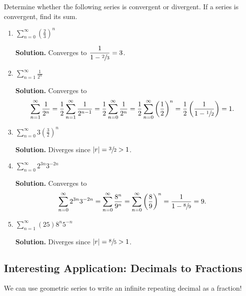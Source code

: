 \setcounter{section}{2}
\begin{Example}{}{}
    Determine whether the following series is convergent or divergent. If a series is
    convergent, find its sum.
    \begin{enumerate}[label=(\roman*)]
        \item $ \displaystyle\sum\limits_{n=0}^{\infty} \left( \frac{2}{3}  \right)^n $

              \textbf{Solution.} Converges to
              $ \displaystyle \frac{1}{1-\sfrac{2}{3}}=3 $.
        \item $ \displaystyle \sum\limits_{n=1}^{\infty} \frac{1}{2^n} $

              \textbf{Solution.} Converges to
              \[ \sum\limits_{n=1}^{\infty} \frac{1}{2^n}
                  =\frac{1}{2} \sum\limits_{n=1}^{\infty} \frac{1}{2^{n-1}}
                  =\frac{1}{2} \sum\limits_{n=0}^{\infty} \frac{1}{2^n}
                  =\frac{1}{2} \sum\limits_{n=0}^{\infty} \left( \frac{1}{2}  \right)^n
                  =\frac{1}{2} \left( \frac{1}{1-\sfrac{1}{2}}  \right)
                  =1. \]
        \item $ \displaystyle\sum\limits_{n=0}^{\infty} 3\left( \frac{3}{2}  \right)^n $

              \textbf{Solution.} Diverges since $ \lvert r\rvert=\sfrac{3}{2} >1 $.
        \item $ \displaystyle\sum\limits_{n=0}^{\infty} 2^{3n}3^{-2n} $

              \textbf{Solution.} Converges to
              \[
                  \sum\limits_{n=0}^{\infty} 2^{3n}3^{-2n}
                  =\sum\limits_{n=0}^{\infty} \frac{8^n}{9^n}
                  =\sum\limits_{n=0}^{\infty}
                  \left( \frac{8}{9}  \right)^n
                  =\frac{1}{1-\sfrac{8}{9}}
                  =9. \]
        \item $ \displaystyle\sum\limits_{n=1}^{\infty} (25) 8^n5^{-n} $

              \textbf{Solution.} Diverges since $ \lvert r\rvert=\sfrac{8}{5} >1 $.
    \end{enumerate}
\end{Example}

\subsection*{Interesting Application: Decimals to Fractions}
We can use geometric series to write an infinite repeating decimal as a fraction!

